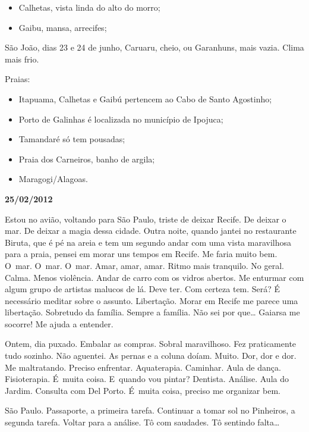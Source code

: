 \begin{itemize}
\item
  Calhetas, vista linda do alto do morro;
\item
  Gaibu, mansa, arrecifes;
\end{itemize}
São João, dias 23 e 24 de junho, Caruaru, cheio, ou Garanhuns, mais
vazia. Clima mais frio.

Praias:

\begin{itemize}
\item
  Itapuama, Calhetas e Gaibú pertencem ao Cabo de Santo Agostinho;
\item
  Porto de Galinhas é localizada no município de Ipojuca;
\item
  Tamandaré só tem pousadas;
\item
  Praia dos Carneiros, banho de argila;
\item
  Maragogi/Alagoas.
\end{itemize}

\begin{center}\asterisc{}\end{center}

\begin{flushright}\textbf{25/02/2012}\end{flushright}


Estou no avião, voltando para São Paulo, triste de deixar Recife. De
deixar o mar. De deixar a magia dessa cidade. Outra noite, quando jantei
no restaurante Biruta, que é pé na areia e tem um segundo andar com uma
vista maravilhosa para a praia, pensei em morar uns tempos em Recife. Me
faria muito bem. O~mar. O~mar. O~mar. Amar, amar, amar. Ritmo mais
tranquilo. No geral. Calma. Menos violência. Andar de carro com os
vidros abertos. Me enturmar com algum grupo de artistas malucos de lá.
Deve ter. Com certeza tem. Será? É necessário meditar sobre o assunto.
Libertação. Morar em Recife me parece uma libertação. Sobretudo da
família. Sempre a família. Não sei por que… Gaiarsa me socorre!
Me ajuda a entender.

Ontem, dia puxado. Embalar as compras. Sobral maravilhoso. Fez
praticamente tudo sozinho. Não aguentei. As pernas e a coluna doíam.
Muito. Dor, dor e dor. Me maltratando. Preciso enfrentar. Aquaterapia.
Caminhar. Aula de dança. Fisioterapia. É~muita coisa. E~quando vou
pintar? Dentista. Análise. Aula do Jardim. Consulta com Del Porto. É~muita coisa, preciso me organizar bem.

São Paulo. Passaporte, a primeira tarefa. Continuar a tomar sol no
Pinheiros, a segunda tarefa. Voltar para a análise. Tô com saudades. Tô
sentindo falta…

